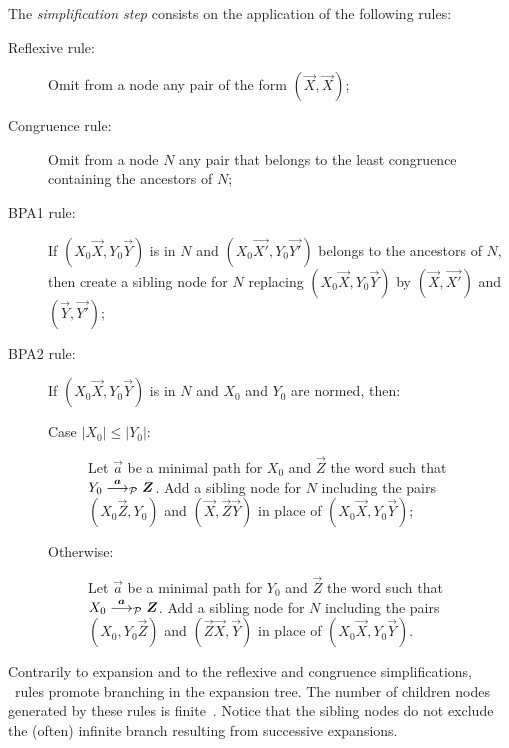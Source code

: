 The \emph{simplification step} consists on the application of the
following rules:
%
\begin{description}
\item[Reflexive rule:] Omit from a node any pair of the form
  $(\vec X,\vec X)$;
\item[Congruence rule:] Omit from a node $N$ any pair that belongs to
  the least congruence containing the ancestors of $N$;
\item[BPA1 rule:] If $(X_0 \vec X, Y_0 \vec Y)$ is in
  $N$ and $(X_0 \vec {X'}, Y_0 \vec {Y'})$ belongs to the ancestors of
  $N$, then create a sibling node for $N$ replacing
  $(X_0 \vec X, Y_0 \vec Y)$ by $(\vec X, \vec {X'})$ and
  $(\vec Y, \vec {Y'})$;
\item[BPA2 rule:] If $(X_0 \vec X, Y_0 \vec Y)$ is in $N$
  and $X_0$ and $Y_0$ are normed, then:
  \begin{description}
  \item[Case $|X_0| \leq |Y_0|$:] Let $\vec a$ be a minimal path
    for $X_0$ and $\vec Z$ the word such that
    $ Y_0 \LTSderivesP[\vec a] \vec Z$. Add a sibling node for
    $N$ including the pairs $(X_0 \vec Z, Y_0)$ and
    $(\vec X, \vec Z \vec Y)$ in place of $(X_0 \vec X, Y_0 \vec Y)$;
  \item[Otherwise:] Let $\vec a$ be a minimal path for 
    $Y_0$ and $\vec Z$ the word such that
    $ X_0 \LTSderivesP[\vec a] \vec Z$. Add a sibling node for $N$
    including the pairs $(X_0 , Y_0 \vec Z )$ and
    $(\vec Z\vec X, \vec Y)$ in place of $(X_0 \vec X, Y_0 \vec Y)$.
  \end{description}
\end{description}

Contrarily to expansion and to the reflexive and congruence
simplifications, \BPA\ rules promote branching in the expansion
tree. The number of children nodes generated by these rules is
finite~\cite{DBLP:journals/iandc/ChristensenHS95}.
%
Notice that the sibling nodes do not exclude the (often) infinite
branch resulting from successive expansions.

